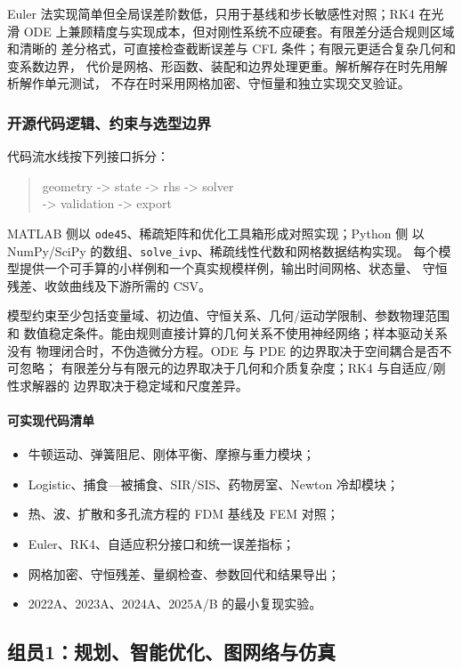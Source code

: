 \documentclass[UTF8,a4paper,12pt]{ctexart}
\begin{document}
Euler 法实现简单但全局误差阶数低，只用于基线和步长敏感性对照；RK4 在光滑 ODE
上兼顾精度与实现成本，但对刚性系统不应硬套。有限差分适合规则区域和清晰的
差分格式，可直接检查截断误差与 CFL 条件；有限元更适合复杂几何和变系数边界，
代价是网格、形函数、装配和边界处理更重。解析解存在时先用解析解作单元测试，
不存在时采用网格加密、守恒量和独立实现交叉验证。

\subsubsection{开源代码逻辑、约束与选型边界}

代码流水线按下列接口拆分：
\begin{quote}
\small\ttfamily
geometry -> state -> rhs -> solver\\
-> validation -> export
\end{quote}
MATLAB 侧以 \texttt{ode45}、稀疏矩阵和优化工具箱形成对照实现；Python 侧
以 NumPy/SciPy 的数组、\texttt{solve\_ivp}、稀疏线性代数和网格数据结构实现。
每个模型提供一个可手算的小样例和一个真实规模样例，输出时间网格、状态量、
守恒残差、收敛曲线及下游所需的 CSV。

模型约束至少包括变量域、初边值、守恒关系、几何/运动学限制、参数物理范围和
数值稳定条件。能由规则直接计算的几何关系不使用神经网络；样本驱动关系没有
物理闭合时，不伪造微分方程。ODE 与 PDE 的边界取决于空间耦合是否不可忽略；
有限差分与有限元的边界取决于几何和介质复杂度；RK4 与自适应/刚性求解器的
边界取决于稳定域和尺度差异。

\paragraph{可实现代码清单}
\begin{itemize}
  \item 牛顿运动、弹簧阻尼、刚体平衡、摩擦与重力模块；
  \item Logistic、捕食—被捕食、SIR/SIS、药物房室、Newton 冷却模块；
  \item 热、波、扩散和多孔流方程的 FDM 基线及 FEM 对照；
  \item Euler、RK4、自适应积分接口和统一误差指标；
  \item 网格加密、守恒残差、量纲检查、参数回代和结果导出；
  \item 2022A、2023A、2024A、2025A/B 的最小复现实验。
\end{itemize}

\subsection{组员1：规划、智能优化、图网络与仿真}
\end{document}
